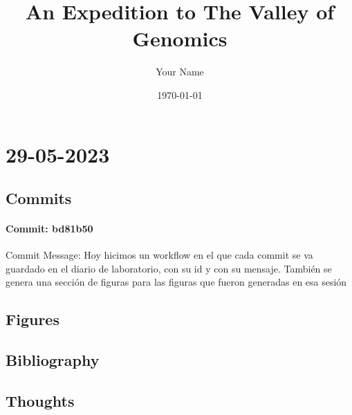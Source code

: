\documentclass{article}
\begin{document}
\title{An Expedition to The Valley of Genomics}
\author{Your Name}
\date{\today}

\maketitle



\section{29-05-2023}
\subsection{Commits}
\paragraph{Commit: bd81b50}
Commit Message: Hoy hicimos un workflow en el que cada commit se va guardado en el diario de laboratorio, con su id y con su mensaje. También se genera una sección de figuras para las figuras que fueron generadas en esa sesión

\subsection{Figures}
\subsection{Bibliography}
\subsection{Thoughts}
\end{document}
